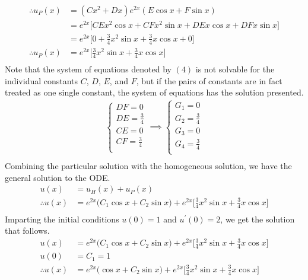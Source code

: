 \documentclass[a4paper]{article}
\newcommand{\ds}{\displaystyle}
\begin{document}
\begin{enumerate}
\begin{align*}
		\therefore u_P(x) & = (Cx^2 + Dx)e^{2x}(E\cos{x} + F\sin{x})\\
		& = e^{2x}\Big[CEx^2\cos{x} + CFx^2\sin{x} + DEx\cos{x} + DFx\sin{x} \Big]\\
		& = e^{2x}\bigg[0 + \frac{3}{4}x^2\sin{x} + \frac{3}{4}x\cos{x} + 0 \bigg]\\
		\therefore u_P(x) & = e^{2x}\bigg[\frac{3}{4}x^2\sin{x} + \frac{3}{4}x\cos{x} \bigg]\\
	\end{align*}
	Note that the system of equations denoted by $\ds{(4)}$ is not solvable for the individual constants $\ds{C}$, $\ds{D}$, $\ds{E}$, and $\ds{F}$, but if the pairs of constants are in fact treated as one single constant, the system of equations has the solution presented. 
	\begin{align*}
		\begin{cases}
			DF = 0\\
			DE = \frac{3}{4}\\
			CE = 0\\
			CF = \frac{3}{4}\\
		\end{cases}
		\implies 
		\begin{cases}
			G_1 = 0\\
			G_2 = \frac{3}{4}\\
			G_3 = 0\\
			G_4 = \frac{3}{4}\\
		\end{cases}\\
	\end{align*}
	Combining the particular solution with the homogeneous solution, we have the general solution to the ODE.
	\begin{align*}
		u(x) & = u_H(x) + u_P(x)\\
		\therefore u(x) & = e^{2x}\Big(C_1\cos{x} + C_2\sin{x}\Big) + e^{2x}\bigg[\frac{3}{4}x^2\sin{x} + \frac{3}{4}x\cos{x} \bigg]\\
	\end{align*}
	Imparting the initial conditions $\ds{u(0) = 1}$ and $\ds{u^{\prime}(0) = 2}$, we get the solution that follows.
	\begin{align*}
		u(x) & = e^{2x}\Big(C_1\cos{x} + C_2\sin{x}\Big) + e^{2x}\bigg[\frac{3}{4}x^2\sin{x} + \frac{3}{4}x\cos{x} \bigg]\\
		u(0) & = C_1 = 1 \\
		\therefore u(x) & = e^{2x}\Big(\cos{x} + C_2\sin{x}\Big) + e^{2x}\bigg[\frac{3}{4}x^2\sin{x} + \frac{3}{4}x\cos{x} \bigg]\\

\end{align*}
\end{enumerate}
\end{document}
